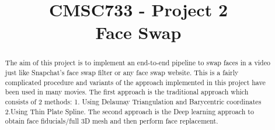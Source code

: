\documentclass[conference]{IEEEtran}
\begin{document}
\title{CMSC733 - Project 2\\Face Swap}

\author{
\and

}
\maketitle

\begin{abstract}
The aim of this project is to implement an end-to-end pipeline to swap faces in a video just like Snapchat’s face swap filter or any face swap website. This is a fairly complicated procedure and variants of the approach implemented in this project have been used in many movies. The first approach is the traditional approach which consists of 2 methods: 1. Using Delaunay Triangulation and Barycentric coordinates 2.Using Thin Plate Spline. The second approach is the Deep learning approach to obtain face fiducials/full 3D mesh and then perform face replacement.
\end{abstract}

\IEEEpeerreviewmaketitle
\end{document}
